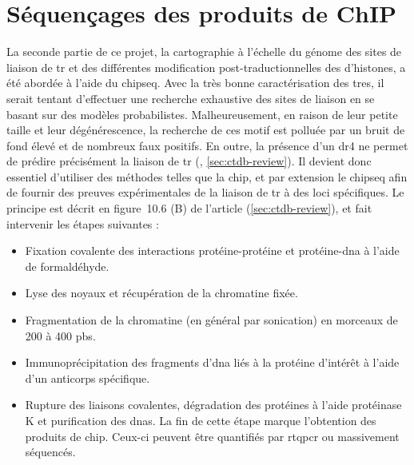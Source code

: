



\section{Séquençages des produits de ChIP}
La seconde partie de ce projet, la cartographie à l'échelle du génome des sites de liaison de \gls{tr} et des différentes modification post-traductionnelles des d'histones, a été abordée à l'aide du \gls{chipseq}.
Avec la très bonne caractérisation des \glspl{tre}, il serait tentant d'effectuer une recherche exhaustive des sites de liaison en se basant sur des modèles probabilistes.
Malheureusement, en raison de leur petite taille et leur dégénérescence, la recherche de ces motif est polluée par un bruit de fond élevé et de nombreux faux positifs.
En outre, la présence d'un \gls{dr4} ne permet de prédire précisément la liaison de \gls{tr} (\citet{Grimaldi2013}, \autoref{sec:ctdb-review}).
Il devient donc essentiel d'utiliser des méthodes telles que la \gls{chip}, et par extension le \gls{chipseq} afin de fournir des preuves expérimentales de la liaison de \gls{tr} à des loci spécifiques.
Le principe est décrit en figure~10.6 (B) de l'article \citet{Grimaldi2013} (\autoref{sec:ctdb-review}), et fait intervenir les étapes suivantes :
\begin{itemize}
\item Fixation covalente des interactions protéine-protéine et protéine-\gls{dna} à l'aide de formaldéhyde.
\item Lyse des noyaux et récupération de la chromatine fixée.
\item Fragmentation de la chromatine (en général par sonication) en morceaux de 200 à 400 \glspl{pb}.
\item Immunoprécipitation des fragments d'\gls{dna} liés à la protéine d'intérêt à l'aide d'un anticorps spécifique.
\item Rupture des liaisons covalentes, dégradation des protéines à l'aide protéinase K et purification des \glspl{dna}.
La fin de cette étape marque l'obtention des produits de \gls{chip}.
Ceux-ci peuvent être quantifiés par \gls{rtqpcr} ou massivement séquencés.
\end{itemize}


